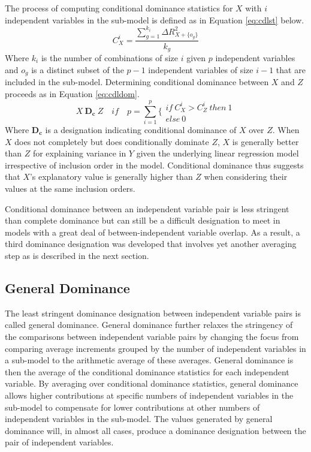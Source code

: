 \documentclass[man]{apa7}
\begin{document}
	The process of computing conditional dominance statistics for $X$ with $i$ independent variables in the sub-model is defined as in Equation \ref{eq:cdlst} below.
	\begin{equation}
		C^{i}_{X} = \frac{\sum^{k_i}_{g=1} \Delta R^2_{X + \{o_g\}}}{k_g}
		\label{eq:cdlst}
	\end{equation}
	Where $k_i$ is the number of combinations of size $i$ given $p$ independent variables and $o_g$ is a distinct subset of the $p - 1$ independent variables of size $i - 1$ that are included in the sub-model.	
	Determining conditional dominance between $X$ and $Z$ proceeds as in Equation \ref{eq:cdldom}.
	\begin{equation}
		X \ \mathbf{D_c} \ Z \quad if \quad p = \sum^p_{i=1} \Biggl\{ 
		\begin{array}{l}
			if \ C^{i}_{X} > C^{i}_{Z} \ then \ 1 \\ 
			else \ 0 
		\end{array}
		\label{eq:cdldom}
	\end{equation}
	Where $\mathbf{D_c}$ is a designation indicating conditional dominance of $X$ over $Z$.	
	When $X$ does not completely but does conditionally dominate $Z$, $X$ is generally better than $Z$ for explaining variance in $Y$ given the underlying linear regression model irrespective of inclusion order in the model.
	Conditional dominance thus suggests that $X$'s explanatory value is generally higher than $Z$ when considering their values at the same inclusion orders.
	
	Conditional dominance between an independent variable pair is less stringent than complete dominance but can still be a difficult designation to meet in models with a great deal of between-independent variable overlap.
	As a result, a third dominance designation was developed that involves yet another averaging step as is described in the next section.
	
	\subsection{General Dominance}
	
	The least stringent dominance designation between independent variable pairs is called general dominance.
	General dominance further relaxes the stringency of the comparisons between independent variable pairs by changing the focus from comparing average increments grouped by the number of independent variables in a sub-model to the arithmetic average of these averages.
	General dominance is then the average of the conditional dominance statistics for each independent variable.
	By averaging over conditional dominance statistics, general dominance allows higher contributions at specific numbers of independent variables in the sub-model to compensate for lower contributions at other numbers of independent variables in the sub-model. 
	The values generated by general dominance will, in almost all cases, produce a dominance designation between the pair of independent variables.
	
\end{document}
